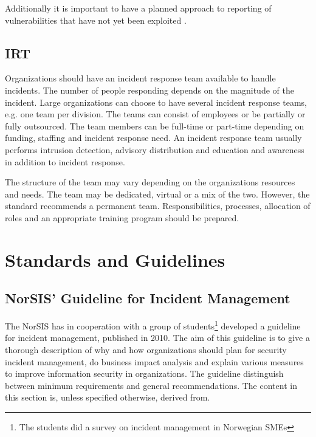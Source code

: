 Additionally it is important to have a planned approach to reporting of vulnerabilities that have not yet been exploited \cite{ISO/IEC27035}.

\subsection{\acl{IRT}}
Organizations should have an incident response team available to handle incidents. The number of people responding depends on the magnitude of the incident. Large organizations can choose to have several incident response teams, e.g. one team per division. The teams can consist of employees or be partially or fully outsourced. The team members can be full-time or part-time depending on funding, staffing and incident response need.  %
An incident response team usually performs intrusion detection, advisory distribution and education and awareness in addition to incident response. \cite{nist800-61}

The structure of the team may vary depending on the organizations resources and needs. The team may be dedicated, virtual or a mix of the two. However, the standard recommends a permanent team. Responsibilities, processes, allocation of roles and an appropriate training program should be prepared. \cite{ISO/IEC27035}

\section{Standards and Guidelines}



\subsection{NorSIS' Guideline for Incident Management}
The \ac{NorSIS} has in cooperation with a group of students\footnote{The students did a survey on incident management in Norwegian \acsp{SME}\cite{sand2010hendelseshaandtering}} developed a guideline for incident management, published in 2010\cite{norsisveiledning}. The aim of this guideline is to give a thorough description of why and how organizations should plan for security incident management, do business impact analysis and explain various measures to improve information security in organizations. The guideline distinguish between minimum requirements and general recommendations. The content in this section is, unless specified otherwise, derived from\cite{norsisveiledning}.

